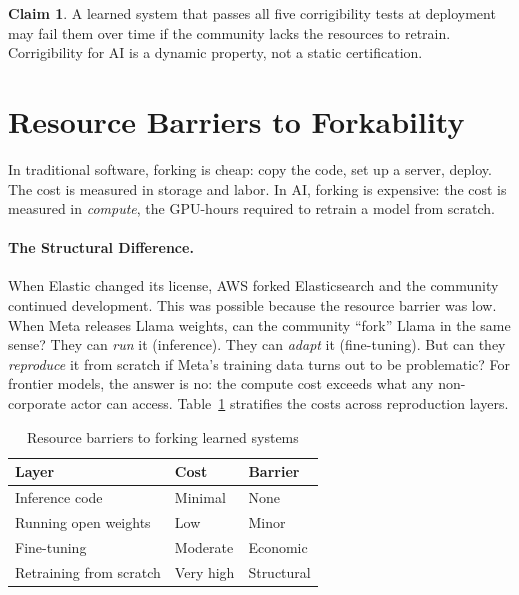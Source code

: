 \documentclass{article}
\theoremstyle{definition}
\newtheorem{claim}{Claim}[section]
\begin{document}
\begin{claim}
A learned system that passes all five corrigibility tests at deployment may fail them over time if the community lacks the resources to retrain. Corrigibility for AI is a dynamic property, not a static certification.
\end{claim}


\section{Resource Barriers to Forkability}
\label{sec:fork-ai}

In traditional software, forking is cheap: copy the code, set up a server, deploy. The cost is measured in storage and labor. In AI, forking is expensive: the cost is measured in \textit{compute}, the GPU-hours required to retrain a model from scratch.

\paragraph{The Structural Difference.} When Elastic changed its license, AWS forked Elasticsearch and the community continued development. This was possible because the resource barrier was low. When Meta releases Llama weights, can the community ``fork'' Llama in the same sense? They can \textit{run} it (inference). They can \textit{adapt} it (fine-tuning). But can they \textit{reproduce} it from scratch if Meta's training data turns out to be problematic? For frontier models, the answer is no: the compute cost exceeds what any non-corporate actor can access. Table~\ref{tab:fork-barriers} stratifies the costs across reproduction layers.

\begin{table}[htbp]
\centering
\begin{tabular}{@{}lll@{}}
\toprule
\textbf{Layer} & \textbf{Cost} & \textbf{Barrier} \\
\midrule
Inference code & Minimal & None \\
Running open weights & Low & Minor \\
Fine-tuning & Moderate & Economic \\
Retraining from scratch & Very high & Structural \\
\bottomrule
\end{tabular}
\caption{Resource barriers to forking learned systems}
\label{tab:fork-barriers}
\end{table}
\end{document}
